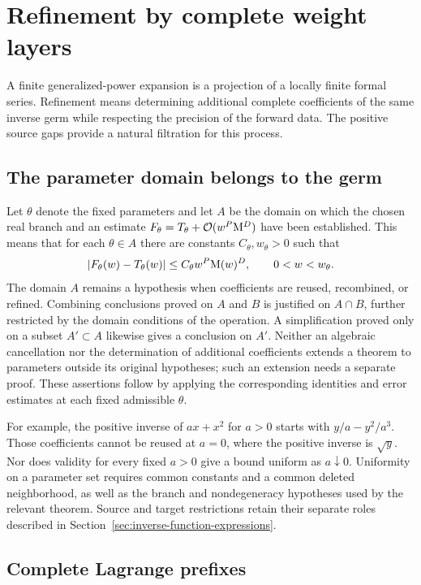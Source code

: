 \section{Refinement by complete weight layers}
\label{sec:refinement-state}

A finite generalized-power expansion is a projection of a locally finite
formal series. Refinement means determining additional complete
coefficients of the same inverse germ while respecting the precision of
the forward data. The positive source gaps provide a natural filtration
for this process.

\subsection{The parameter domain belongs to the germ}
\label{sec:refinement-parameter-domain}

Let $\theta$ denote the fixed parameters and let $A$ be the domain on
which the chosen real branch and an estimate
$F_\theta=T_\theta+\mathcal O(w^P\mathrm M^D)$ have been established. This means
that for each $\theta\in A$ there are constants $C_\theta,w_\theta>0$
such that
\[
 |F_\theta(w)-T_\theta(w)|\le C_\theta w^P\mathrm M(w)^D,
 \qquad 0<w<w_\theta.
\]
The domain $A$ remains a hypothesis when coefficients are reused,
recombined, or refined. Combining conclusions proved on $A$ and $B$
is justified on $A\cap B$, further restricted by the domain conditions
of the operation. A simplification proved only on a subset $A'\subset A$
likewise gives a conclusion on $A'$. Neither an algebraic cancellation
nor the determination of additional coefficients extends a theorem to
parameters outside its original hypotheses; such an extension needs a
separate proof. These assertions follow by applying the corresponding
identities and error estimates at each fixed admissible $\theta$.

For example, the positive inverse of $a x+x^2$ for $a>0$ starts with
$y/a-y^2/a^3$. Those coefficients cannot be reused at $a=0$, where
the positive inverse is $\sqrt y$. Nor does validity for every fixed
$a>0$ give a bound uniform as $a\downarrow0$. Uniformity on a parameter
set requires common constants and a common deleted neighborhood, as well
as the branch and nondegeneracy hypotheses used by the relevant theorem.
Source and target restrictions retain their separate roles described in
Section~\ref{sec:inverse-function-expressions}.

\subsection{Complete Lagrange prefixes}

